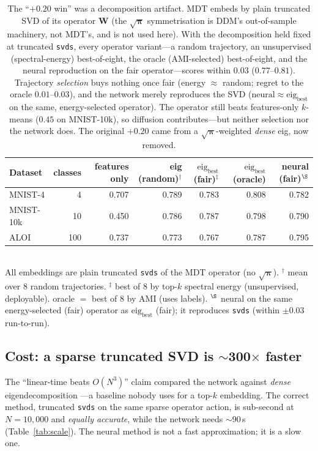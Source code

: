 \documentclass[10pt,twocolumn]{article}
\newcommand{\W}{\mathbf{W}}
\newcommand{\bp}{\boldsymbol{\pi}}
\begin{document}
\begin{table}[t]\centering\footnotesize
\caption{The ``$+0.20$ win'' was a decomposition artifact. MDT embeds by plain truncated SVD of its
operator $\W$ (the $\sqrt{\bp}$ symmetrisation is DDM's out-of-sample machinery, not MDT's, and is not
used here). With the decomposition held fixed at truncated \texttt{svds}, every operator variant---a
random trajectory, an unsupervised (spectral-energy) best-of-eight, the oracle (AMI-selected)
best-of-eight, and the neural reproduction on the fair operator---scores within $0.03$ ($0.77$--$0.81$).
Trajectory \emph{selection} buys nothing once fair (energy $\approx$ random; regret to the oracle
$0.01$--$0.03$), and the network merely reproduces the SVD ($\text{neural}\approx\text{eig}_{\text{best}}$
on the same, energy-selected operator). The operator still beats features-only $k$-means ($0.45$ on
MNIST-10k), so diffusion contributes---but neither selection nor the network does. The original $+0.20$
came from a $\sqrt{\bp}$-weighted \emph{dense} eig, now removed.}
\label{tab:confound}
\begin{tabular}{l r r r r r r}
\toprule
Dataset & classes & features only & eig (random)$^\dagger$ & $\text{eig}_{\text{best}}$ (fair)$^\ddagger$ & $\text{eig}_{\text{best}}$ (oracle) & neural (fair)$^\S$\\
\midrule
MNIST-4   & 4   & 0.707 & 0.789 & 0.783 & 0.808 & 0.782\\
MNIST-10k & 10  & 0.450 & 0.786 & 0.787 & 0.798 & 0.790\\
ALOI      & 100 & 0.737 & 0.773 & 0.767 & 0.787 & 0.795\\
\bottomrule
\end{tabular}\\[2pt]
{\footnotesize All embeddings are plain truncated \texttt{svds} of the MDT operator (no $\sqrt{\bp}$).
$^\dagger$ mean over $8$ random trajectories. $^\ddagger$ best of $8$ by top-$k$ spectral energy
(unsupervised, deployable). oracle $=$ best of $8$ by AMI (uses labels). $^\S$ neural on the same
energy-selected (fair) operator as $\text{eig}_{\text{best}}$ (fair); it reproduces \texttt{svds}
(within ${\pm}0.03$ run-to-run).}
\end{table}

\subsection{Cost: a sparse truncated SVD is $\sim$300$\times$ faster}
The ``linear-time beats $O(N^3)$'' claim compared the network against \emph{dense} eigendecomposition
---a baseline nobody uses for a top-$k$ embedding. The correct method, truncated \texttt{svds} on the
same sparse operator action, is sub-second at $N=10{,}000$ and \emph{equally accurate}, while the
network needs $\sim$90\,s (Table~\ref{tab:scale}). The neural method is not a fast approximation; it is
a slow one.
\end{document}
